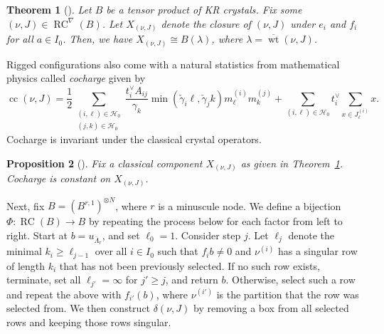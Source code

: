 \documentclass[reqno]{amsart}
\newcommand{\HH}{\mathcal{H}}
\newcommand{\clfw}{\overline{\Lambda}} %
\newcommand{\iso}{\cong}
\newcommand{\modgamma}{\check{\gamma}} %
\DeclareMathOperator{\RC}{RC} %
\DeclareMathOperator{\wt}{wt} %
\DeclareMathOperator{\cc}{cc} %
\newcommand{\hwRC}{\RC^{\nabla}} %
\newcommand{\ZZ}{\mathbb{Z}}
\newcommand{\defn}[1]{{\color{darkred}\emph{#1}}} %
\theoremstyle{plain}
\newtheorem{thm}{Theorem}[section]
\newtheorem{prop}[thm]{Proposition}
\theoremstyle{definition}
\newtheorem{remark}[thm]{Remark}
\numberwithin{equation}{section}
\begin{document}
\begin{thm}[{\cite{S06,SchillingS15}}]
\label{thm:rc_crystal}
Let $B$ be a tensor product of KR crystals. Fix some $(\nu, J) \in \hwRC(B)$. Let $X_{(\nu, J)}$ denote the closure of $(\nu, J)$ under $e_i$ and $f_i$ for all $a \in I_0$.
Then, we have $X_{(\nu, J)} \iso B(\lambda)$, where $\lambda = \overline{\wt}(\nu, J)$.
\end{thm}

%
%

Rigged configurations also come with a natural statistics from mathematical physics called \defn{cocharge} given by
\[
\cc(\nu, J) = \frac{1}{2} \sum_{\substack{(i, \ell) \in \HH_0 \\ (j, k) \in \HH_0}} \frac{t_i^{\vee} A_{ij}}{\gamma_k} \min(\modgamma_i \ell, \modgamma_j k) m_{\ell}^{(i)} m_k^{(j)} + \sum_{(i, \ell) \in \HH_0} t_i^{\vee} \sum_{x \in J_{\ell}^{(i)}} x.
\]
Cocharge is invariant under the classical crystal operators.
\begin{prop}[{\cite{S06, SchillingS15}}]
\label{prop:cocharge_classical_invar}
Fix a classical component $X_{(\nu, J)}$ as given in Theorem~\ref{thm:rc_crystal}.
Cocharge is constant on $X_{(\nu, J)}$.
\end{prop}

Next, fix $B = (B^{r,1})^{\otimes N}$, where $r$ is a minuscule node.
We define a bijection $\Phi \colon \RC(B) \to B$ by repeating the process below for each factor from left to right.
Start at $b = u_{\clfw_r}$, and set $\ell_0 = 1$.
Consider step $j$.
Let $\ell_j$ denote the minimal $k_i \geq \ell_{j-1}$ over all $i \in I_0$ such that $f_i b \neq 0$ and $\nu^{(i)}$ has a singular row of length $k_i$ that has not been previously selected.
If no such row exists, terminate, set all $\ell_{j'} = \infty$ for $j' \geq j$, and return $b$.
Otherwise, select such a row and repeat the above with $f_{i'}(b)$, where $\nu^{(i')}$ is the partition that the row was selected from.
We then construct $\delta(\nu, J)$ by removing a box from all selected rows and keeping those rows singular.
\end{document}

